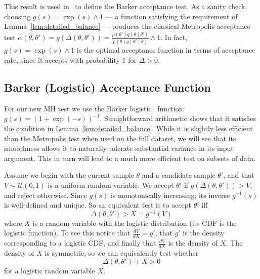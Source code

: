 \documentclass[twoside]{article} \usepackage{aistats2017}
\begin{document}
This result is used in~\citet{Barker65} to define the Barker acceptance test.  As
a sanity check, choosing $g(s) = \exp(s) \wedge 1$ --- a function satisfying the
requirement of Lemma~\ref{lem:detailed_balance} --- produces the classical
Metropolis acceptance test $\alpha(\theta,\theta') = g(\Delta(\theta,\theta')) =
\frac{p(\theta')q(\theta \mid \theta')}{p(\theta)q(\theta' \mid \theta)}\wedge
1$. In fact, $g(s) =\exp(s) \wedge 1$ is the optimal acceptance function in
terms of acceptance rate, since it accepts with probability 1 for $\Delta > 0$.

\subsection{Barker (Logistic) Acceptance Function}\label{ssec:barker_function}
For our new MH test we use the Barker logistic~\citep{Barker65} function:
$g(s)=(1+\exp(-s))^{-1}$. Straightforward arithmetic shows that it satisfies the
condition in Lemma~\ref{lem:detailed_balance}.  While it is slightly less
efficient than the Metropolis test when used on the full dataset, we will see
that its smoothness allows it to naturally tolerate substantial variance in its
input argument. This in turn will lead to a much more efficient test on subsets
of data.

Assume we begin with the current sample $\theta$ and a candidate sample
$\theta'$, and that $V \sim \mathcal{U}(0,1)$ is a uniform random variable. We
accept $\theta'$ if $g(\Delta(\theta,\theta')) > V$, and reject otherwise.
Since $g(s)$ is monotonically increasing, its inverse $g^{-1}(s)$ is
well-defined and unique. So an equivalent test is to accept $\theta'$ iff
\begin{equation}\label{eq:equivalent_test}
    \Delta(\theta,\theta') > X = g^{-1}(V)
\end{equation}
where $X$ is a random variable with the logistic distribution (its CDF is the
logistic function). To see this notice that $\frac{dV}{dX} = g'$, that $g'$ is
the density corresponding to a logistic CDF, and finally that $\frac{dV}{dX}$ is
the density of $X$. The density of $X$ is symmetric, so we can equivalently test
whether
\begin{equation}\label{eq:the_exact_test}
    \Delta(\theta,\theta') + X > 0
\end{equation}
for a logistic random variable $X$.
\end{document}

